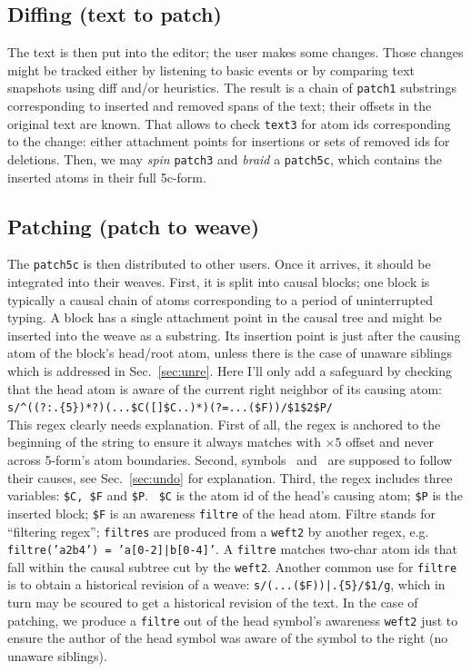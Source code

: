 \documentclass{sig-alternate}
\begin{document}
\subsection{Diffing (text to patch)}
The text is then put into the editor; the user makes some changes.
Those changes might be tracked either by listening to  basic events or by comparing text snapshots using diff and/or heuristics.
The result is a chain of {\tt patch1} substrings corresponding to inserted and removed spans of the text; their offsets in the original text are known.
That allows to check {\tt text3} for atom ids corresponding to the change: either attachment points for insertions or sets of removed ids for deletions.
Then, we may \emph{spin} {\tt patch3} and \emph{braid} a {\tt patch5c}, which contains the inserted atoms in their full 5c-form. 

\subsection{Patching (patch to weave)}
The {\tt patch5c} is then distributed to other users. Once it arrives, it should be integrated into their weaves.
First, it is split into causal blocks; one block is typically a causal chain of atoms corresponding to a period of uninterrupted typing.
A block has a single attachment point in the causal tree and might be inserted into the weave as a substring.
Its insertion point is just after the causing atom of the block's head/root atom, unless there is the case of unaware siblings which is addressed in Sec.~\ref{sec:unre}. Here I'll only add a safeguard by checking that the head atom is aware of the current right neighbor of its causing atom: \\
{\small \verb`s/^((?:.{5})*?)(...$C([`\bsp\cnc\verb`]$C..)*)(?=...($F))/$1$2$P/`}\\
This regex clearly needs explanation.
First of all, the regex is anchored to the beginning of the string to ensure it always matches with $\times 5$ offset and never across 5-form's atom boundaries.
Second, symbols \bsp~and \cnc~are supposed to follow their causes, see Sec.~\ref{sec:undo} for explanation.
Third, the regex includes three variables: \verb+$C, $F+ and \verb+$P+.
~\verb+$C+ is the atom id of the head's causing atom; \verb+$P+ is the inserted block; \verb+$F+ is an awareness {\tt filtre} of the head atom.
Filtre stands for ``filtering regex''; {\tt filtres} are produced from a {\tt weft2} by another regex, e.g. {\tt filtre('a2b4') = 'a[0-2]|b[0-4]'}.
A {\tt filtre} matches two-char atom ids that fall within the causal subtree cut by the {\tt weft2}.
Another common use for {\tt filtre} is to obtain a historical revision of a weave:  {\small \verb`s/(...($F))|.{5}/$1/g`}, which in turn may be scoured to get a historical revision of the text.
In the case of patching, we produce a {\tt filtre} out of the head symbol's awareness {\tt weft2} just to ensure the author of the head symbol was aware of the symbol to the right (no unaware siblings).
\end{document}
